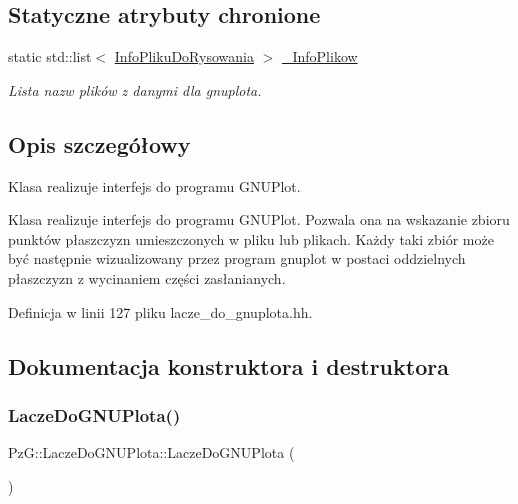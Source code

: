 \subsection*{Statyczne atrybuty chronione}
\begin{DoxyCompactItemize}
\item 
static std\+::list$<$ \hyperlink{class_pz_g_1_1_info_pliku_do_rysowania}{Info\+Pliku\+Do\+Rysowania} $>$ \hyperlink{class_pz_g_1_1_lacze_do_g_n_u_plota_a1916c5a6fecfb3554e9d5204b2f2086c}{\+\_\+\+Info\+Plikow}
\begin{DoxyCompactList}\small\item\em Lista nazw plików z danymi dla {\itshape gnuplota}. \end{DoxyCompactList}\end{DoxyCompactItemize}


\subsection{Opis szczegółowy}
Klasa realizuje interfejs do programu G\+N\+U\+Plot. 

Klasa realizuje interfejs do programu G\+N\+U\+Plot. Pozwala ona na wskazanie zbioru punktów płaszczyzn umieszczonych w pliku lub plikach. Każdy taki zbiór może być następnie wizualizowany przez program gnuplot w postaci oddzielnych płaszczyzn z wycinaniem części zasłanianych. 

Definicja w linii 127 pliku lacze\+\_\+do\+\_\+gnuplota.\+hh.



\subsection{Dokumentacja konstruktora i destruktora}
\mbox{\label{class_pz_g_1_1_lacze_do_g_n_u_plota_a5845189b5ab8c3634acf57024e5deeaf}} 
\subsubsection{\texorpdfstring{Lacze\+Do\+G\+N\+U\+Plota()}{LaczeDoGNUPlota()}}
{\footnotesize\ttfamily Pz\+G\+::\+Lacze\+Do\+G\+N\+U\+Plota\+::\+Lacze\+Do\+G\+N\+U\+Plota (\begin{DoxyParamCaption}{ }\end{DoxyParamCaption})}



